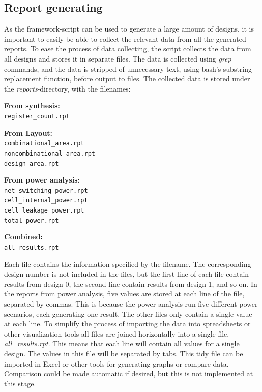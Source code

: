 \subsection{Report generating}
As the framework-script can be used to generate a large amount of designs, it is important to easily be able to collect the relevant data from all the generated reports. To ease the process of data collecting, the script collects the data from all designs and stores it in separate files. The data is collected using \textit{grep} commands, and the data is stripped of unnecessary text, using bash's substring replacement function, before output to files. The collected data is stored under the \textit{reports}-directory, with the filenames:
\begin{multicols}{2}
\textbf{From synthesis:}\\
\verb!register_count.rpt!

\textbf{From Layout:}\\
\verb!combinational_area.rpt!\\
\verb!noncombinational_area.rpt!\\
\verb!design_area.rpt!

\textbf{From power analysis:}\\
\verb!net_switching_power.rpt!\\
\verb!cell_internal_power.rpt!\\
\verb!cell_leakage_power.rpt!\\
\verb!total_power.rpt!

\textbf{Combined:}\\
\verb!all_results.rpt!
\end{multicols}

Each file contains the information specified by the filename. The corresponding design number is not included in the files, but the first line of each file contain results from design 0, the second line contain results from design 1, and so on. In the reports from power analysis, five values are stored at each line of the file, separated by commas. This is because the power analysis run five different power scenarios, each generating one result. The other files only contain a single value at each line. To simplify the process of importing the data into spreadsheets or other visualization-tools all files are joined horizontally into a single file, \textit{all\_results.rpt}. This means that each line will contain all values for a single design. The values in this file will be separated by tabs. This tidy file can be imported in Excel or other tools for generating graphs or compare data. Comparison could be made automatic if desired, but this is not implemented at this stage.

